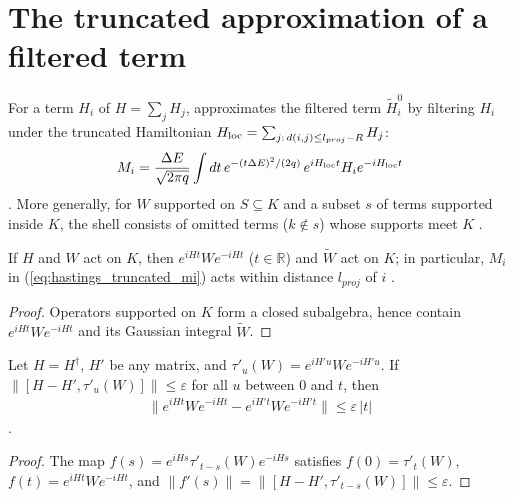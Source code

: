 \section{The truncated approximation of a filtered term}
\label{sec:hastings_truncated_dynamics}


For a term $H_i$ of $H=\sum_jH_j$, \cite{Hastings2006Solving} approximates the
filtered term $\tilde H_i^0$ by filtering $H_i$ under the truncated Hamiltonian
$H_{\rm loc}=\sum_{j:\,d(i,j)\le l_{proj}-R}H_j$:
\begin{align}
    M_i=\frac{\Delta E}{\sqrt{2\pi q}}\int dt\,e^{-(t\Delta E)^2/(2q)}\,
    e^{iH_{\rm loc}t}H_ie^{-iH_{\rm loc}t}
    \label{eq:hastings_truncated_mi}
\end{align}
\cite[eqs.~(mid), (odef), (hpdef), lines 285--303]{Hastings2006Solving}. More
generally, for $W$ supported on $S\subseteq K$ and a subset $s$ of terms
supported inside $K$, the shell consists of omitted terms ($k\notin s$) whose
supports meet $K$ \cite{gap:hastings05_truncated_dynamics}.

\begin{lemma}
    \label{thm:hastings_truncated_support}
    \leanok
    If $H$ and $W$ act on $K$, then $e^{iHt}We^{-iHt}$ ($t\in\mathbb R$) and
    $\widetilde W$ act on $K$; in particular, $M_i$ in
    (\ref{eq:hastings_truncated_mi}) acts within distance $l_{proj}$ of $i$
    \cite[lines 302--304]{Hastings2006Solving}.
\end{lemma}
\begin{proof}
    \leanok
    Operators supported on $K$ form a closed subalgebra, hence contain
    $e^{iHt}We^{-iHt}$ and its Gaussian integral $\widetilde W$.
\end{proof}

\begin{lemma}
    \label{thm:hastings_truncated_evolution_comparison}
    \leanok
    Let $H=H^\dagger$, $H'$ be any matrix, and $\tau'_u(W)=e^{iH'u}We^{-iH'u}$.
    If $\|[H-H',\tau'_u(W)]\|\le\varepsilon$ for all $u$ between $0$ and $t$,
    then
    \begin{align}
        \|e^{iHt}We^{-iHt}-e^{iH't}We^{-iH't}\|\le\varepsilon\,|t|
        \label{eq:hastings_truncated_evolution_comparison}
    \end{align}
    \cite[lines 1469--1482]{Hastings2006Solving}.
\end{lemma}
\begin{proof}
    \leanok
    The map $f(s)=e^{iHs}\tau'_{t-s}(W)e^{-iHs}$ satisfies $f(0)=\tau'_t(W)$,
    $f(t)=e^{iHt}We^{-iHt}$, and
    $\|f'(s)\|=\|[H-H',\tau'_{t-s}(W)]\|\le\varepsilon$.
\end{proof}

